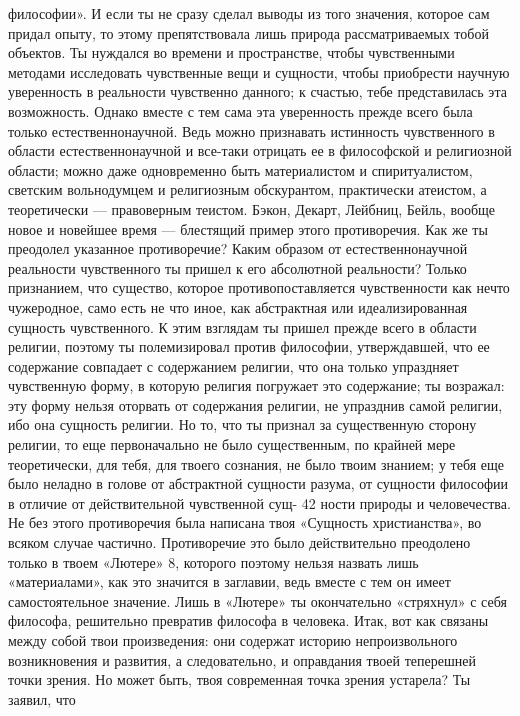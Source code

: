 \documentclass[12pt]{article}
\begin{document}
философии». И если ты не сразу сделал выводы из того 
значения, которое сам придал опыту, то этому  
препятствовала лишь природа рассматриваемых тобой  
объектов. Ты нуждался во времени и пространстве, чтобы 
чувственными методами исследовать чувственные вещи 
и сущности, чтобы приобрести научную уверенность в 
реальности чувственно данного; к счастью, тебе  
представилась эта возможность. Однако вместе с тем сама 
эта уверенность прежде всего была только  
естественнонаучной. Ведь можно признавать истинность  
чувственного в области естественнонаучной и все-таки  
отрицать ее в философской и религиозной области; можно 
даже одновременно быть материалистом и  
спиритуалистом, светским вольнодумцем и религиозным  
обскурантом, практически атеистом, а теоретически — 
правоверным теистом. Бэкон, Декарт, Лейбниц, Бейль, 
вообще новое и новейшее время — блестящий пример 
этого противоречия. Как же ты преодолел указанное 
противоречие? Каким образом от естественнонаучной 
реальности чувственного ты пришел к его абсолютной 
реальности? Только признанием, что существо, которое 
противопоставляется чувственности как нечто  
чужеродное, само есть не что иное, как абстрактная или  
идеализированная сущность чувственного. К этим взглядам 
ты пришел прежде всего в области религии, поэтому ты 
полемизировал против философии, утверждавшей, что 
ее содержание совпадает с содержанием религии, что 
она только упраздняет чувственную форму, в которую 
религия погружает это содержание; ты возражал: эту 
форму нельзя оторвать от содержания религии, не  
упразднив самой религии, ибо она сущность религии. Но 
то, что ты признал за существенную сторону религии, 
то еще первоначально не было существенным, по  
крайней мере теоретически, для тебя, для твоего сознания, 
не было твоим знанием; у тебя еще было неладно в  
голове от абстрактной сущности разума, от сущности  
философии в отличие от действительной чувственной сущ- 
42 
ности природы и человечества. Не без этого  
противоречия была написана твоя «Сущность христианства», во 
всяком случае частично. Противоречие это было  
действительно преодолено только в твоем «Лютере» 8,  
которого поэтому нельзя назвать лишь «материалами», как 
это значится в заглавии, ведь вместе с тем он имеет 
самостоятельное значение. Лишь в «Лютере» ты  
окончательно «стряхнул» с себя философа, решительно  
превратив философа в человека. 
Итак, вот как связаны между собой твои  
произведения: они содержат историю непроизвольного  
возникновения и развития, а следовательно, и оправдания твоей 
теперешней точки зрения. Но может быть, твоя  
современная точка зрения устарела? Ты заявил, что  
\end{document}
